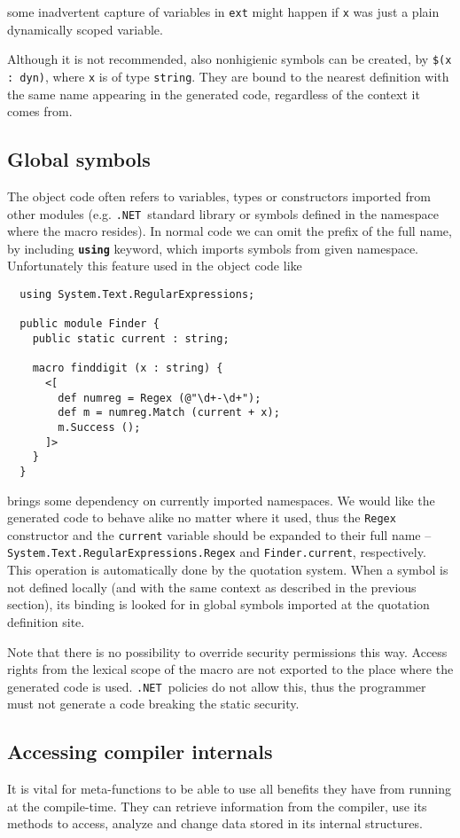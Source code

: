 \documentclass{llncs}
\newcommand{\net}[0]{{\tt .NET}}
\newcommand{\kw}[1]{{\tt \bf #1}}
\begin{document}
\noindent
some inadvertent capture of variables in \verb,ext, might happen if 
\verb,x, was just a plain dynamically scoped variable.

Although it is not recommended, also nonhigienic symbols can be created, by
\verb,$(x : dyn),, where \verb,x, is of type \verb,string,. %
They are bound to the nearest definition with the same name appearing in the
generated code, regardless of the context it comes from.

\subsection{Global symbols}
The object code often refers to variables, types or constructors imported
from other modules (e.g. \net\ standard library or symbols defined in 
the namespace where the macro resides). In normal code we can omit the prefix 
of the full name, by including \kw{using} keyword, which imports symbols from
given namespace. Unfortunately this feature used in the object code like

\begin{verbatim}
  using System.Text.RegularExpressions;

  public module Finder {
    public static current : string;

    macro finddigit (x : string) {
      <[ 
        def numreg = Regex (@"\d+-\d+");
        def m = numreg.Match (current + x);
        m.Success ();
      ]>
    }
  }
\end{verbatim} %

\noindent
brings some dependency on currently imported namespaces. We would like the
generated code to behave alike no matter where it used, thus the
\verb,Regex, constructor and the \verb,current, variable should be expanded to
their full name -- \verb,System.Text.RegularExpressions.Regex,
and \verb,Finder.current,, respectively. This operation is automatically
done by the quotation system. When a symbol is not defined locally (and with 
the same context as described in the previous section), its binding is 
looked for in global symbols imported at the quotation definition site.

Note that there is no possibility to override security permissions this
way. Access rights from the lexical scope of the macro are not exported to 
the place where the generated code is used. \net\ policies do not allow this, 
thus the programmer must not generate a code breaking the static security.

\subsection{Accessing compiler internals}
It is vital for meta-functions to be able to use all benefits they have
from running at the compile-time. They can retrieve information from the
compiler, use its methods to access, analyze and change data stored
in its internal structures. 
\end{document}

